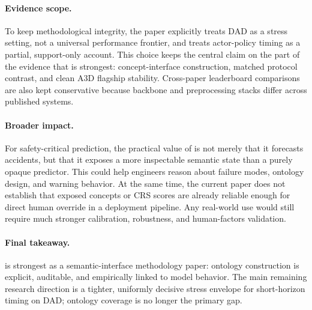 \paragraph{Evidence scope.}
To keep methodological integrity, the paper explicitly treats DAD as a
stress setting, not a universal performance frontier, and treats actor-policy
timing as a partial, support-only account. This choice keeps the central claim
on the part of the evidence that is strongest: concept-interface construction,
matched protocol contrast, and clean A3D flagship stability.
Cross-paper leaderboard comparisons are also kept conservative because backbone
and preprocessing stacks differ across published systems.

\paragraph{Broader impact.}
For safety-critical prediction, the practical value of \method{} is not merely
that it forecasts accidents, but that it exposes a more inspectable semantic
state than a purely opaque predictor. This could help engineers reason about
failure modes, ontology design, and warning behavior. At the same time, the
current paper does not establish that exposed concepts or CRS scores are
already reliable enough for direct human override in a deployment pipeline.
Any real-world use would still require much stronger calibration, robustness,
and human-factors validation.

\paragraph{Final takeaway.}
\method{} is strongest as a semantic-interface methodology paper:
ontology construction is explicit, auditable, and empirically linked to model
behavior.
The main remaining research direction is a tighter, uniformly decisive stress
envelope for short-horizon timing on DAD; ontology coverage is no longer the
primary gap.
